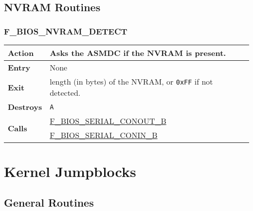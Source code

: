 \documentclass[a4paper,11pt]{article}
\begin{document}
    \subsection{NVRAM Routines}

        \subsubsection{F\_BIOS\_NVRAM\_DETECT}
        \label{func:fbiosnvramdetect}
        \begin{tabular}{l p{9cm}}
            \hline\textbf{Action}
            & Asks the \textbf{ASMDC} if the NVRAM is present. \\
            \hline\textbf{Entry} & None \\
            \hline\textbf{Exit} & length (in bytes) of the NVRAM, or
            \texttt{0xFF} if not detected.\\
            \hline\textbf{Destroys} & \texttt{A} \\
            \hline\multirow[t]{2}{4em}{\textbf{Calls}}
            & \hyperref[func:fbiosserialconoutb]{F\_BIOS\_SERIAL\_CONOUT\_B}\\
            & \hyperref[func:fbiosserialconinb]{F\_BIOS\_SERIAL\_CONIN\_B}\\
            \hline
        \end{tabular}

    \pagebreak
    \section{Kernel Jumpblocks}

    \subsection{General Routines}

\end{document}
